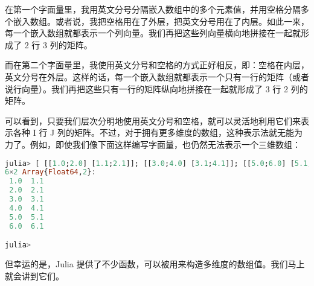 在第一个字面量里，我用英文分号分隔嵌入数组中的多个元素值，并用空格分隔多个嵌入数组。或者说，我把空格用在了外层，把英文分号用在了内层。如此一来，每一个嵌入数组就都表示一个列向量。我们再把这些列向量横向地拼接在一起就形成了 2 行 3 列的矩阵。

而在第二个字面量里，我使用英文分号和空格的方式正好相反，即：空格在内层，英文分号在外层。这样的话，每一个嵌入数组就都表示一个只有一行的矩阵（或者说行向量）。我们再把这些只有一行的矩阵纵向地拼接在一起就形成了 3 行 2 列的矩阵。

可以看到，只要我们层次分明地使用英文分号和空格，就可以灵活地利用它们来表示各种 I 行 J 列的矩阵。不过，对于拥有更多维度的数组，这种表示法就无能为力了。例如，即使我们像下面这样编写字面量，也仍然无法表示一个三维数组：

\begin{lstlisting}[language=julia]
julia> [ [[1.0;2.0] [1.1;2.1]]; [[3.0;4.0] [3.1;4.1]]; [[5.0;6.0] [5.1;6.1]] ]
6×2 Array{Float64,2}:
 1.0  1.1
 2.0  2.1
 3.0  3.1
 4.0  4.1
 5.0  5.1
 6.0  6.1

julia> 
\end{lstlisting}

但幸运的是，Julia 提供了不少函数，可以被用来构造多维度的数组值。我们马上就会讲到它们。
